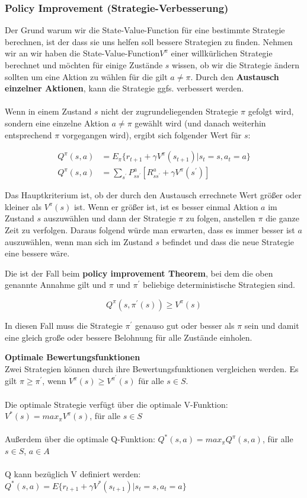 \documentclass[10pt]{scrartcl}
\begin{document}
\subsubsection{Policy Improvement (Strategie-Verbesserung)}
Der Grund warum wir die \glqq State-Value-Function\grqq\xspace für eine bestimmte Strategie berechnen, ist der dass sie uns helfen soll bessere Strategien zu finden. Nehmen wir an wir haben die \glqq State-Value-Function\grqq\xspace $V^{\pi}$ einer willkürlichen Strategie berechnet und möchten für einige Zustände $s$ wissen, ob wir die Strategie ändern sollten um eine Aktion zu wählen für die gilt $a \neq \pi$. Durch den \textbf{Austausch einzelner Aktionen}, kann die Strategie ggfs. verbessert werden.\\
\\  
Wenn in einem Zustand $s$ nicht der zugrundeliegenden Strategie $\pi$ gefolgt wird, sondern eine einzelne Aktion $a \neq \pi$ gewählt wird (und danach weiterhin entsprechend $\pi$ vorgegangen wird), ergibt sich folgender Wert für $s$:

\begin{align}
Q^{\pi}(s,a) &= E_{\pi} \{ r_{t+1} + \gamma V^{\pi}(s_{t+1}) | s_{t}=s, a_{t}=a \}\\
Q^{\pi}(s,a) &= \sum_{s^{'}} P^a_{ss^{'}} [R^a_{ss^{'}} + \gamma V^\pi (s^{'})]
\end{align}

Das Hauptkriterium ist, ob der durch den Austausch errechnete Wert größer oder kleiner als $V^{\pi}(s)$ ist. Wenn er größer ist, ist es besser einmal Aktion $a$ im Zustand $s$ auszuwählen und dann der Strategie $\pi$ zu folgen, anstellen $\pi$ die ganze Zeit zu verfolgen. Daraus folgend würde man erwarten, dass es immer besser ist $a$ auszuwählen, wenn man sich im Zustand $s$ befindet und dass die neue Strategie eine bessere wäre.

Die ist der Fall beim \textbf{policy improvement Theorem}, bei dem die oben genannte Annahme gilt und $\pi$ und $\pi^{'}$ beliebige deterministische Strategien sind.

\begin{equation}
Q^{\pi}(s,\pi^{'}(s)) \geq V^{\pi}(s)
\end{equation}

In diesen Fall muss die Strategie $\pi^{'}$ genauso gut oder besser als $\pi$ sein und damit eine gleich große oder bessere Belohnung für alle Zustände einholen.

\textbf{Optimale Bewertungsfunktionen}\\
Zwei Strategien können durch ihre Bewertungsfunktionen vergleichen werden. Es gilt $\pi \geq \pi^{'}$, wenn $V^{\pi}(s)\geq V^{\pi^{'}}(s)$ für alle $s \in S$.\\
\\
Die optimale Strategie verfügt über die optimale V-Funktion:  $V^{*}(s) = max_{\pi} V^{\pi}(s)$, für alle $s \in S$\\
\\
Außerdem über die optimale Q-Funktion: $Q^{*}(s,a) =  max_{\pi} Q^{\pi}(s,a)$, für alle $s \in S$, $a \in A$\\
\\
Q kann bezüglich V definiert werden: $Q^{*}(s,a) = E \{r_{t+1}+ \gamma V^{*}(s_{t+1}) | s_{t}=s ,a_{t}=a \}$
\end{document}

